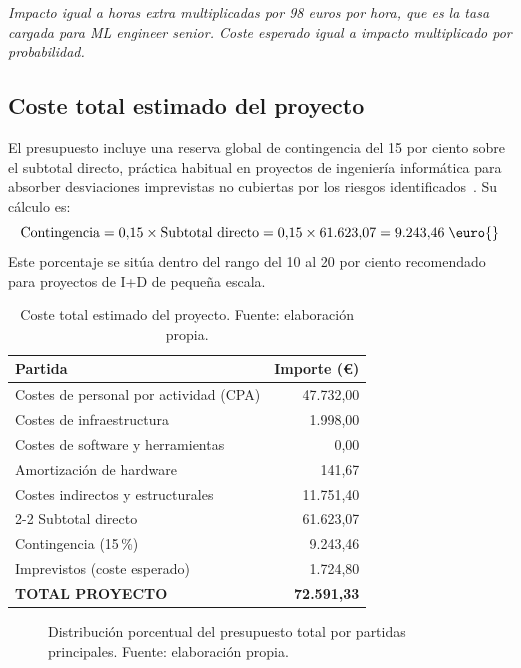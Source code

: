 \noindent\textit{\scriptsize Impacto igual a horas extra multiplicadas por 98 euros por hora, que es la tasa cargada para ML engineer senior. Coste esperado igual a impacto multiplicado por probabilidad.}

\subsection{Coste total estimado del proyecto}

El presupuesto incluye una reserva global de contingencia del 15 por ciento sobre el subtotal directo, práctica habitual en proyectos de ingeniería informática para absorber desviaciones imprevistas no cubiertas por los riesgos identificados~\cite{pmbok}. Su cálculo es:
\[
\text{Contingencia} = 0{,}15 \times \text{Subtotal directo} = 0{,}15 \times 61.623{,}07 = 9.243{,}46\;\text{\euro{}}
\]
Este porcentaje se sitúa dentro del rango del 10 al 20 por ciento recomendado para proyectos de I+D de pequeña escala.

\begin{table}[H]
\centering
\caption{Coste total estimado del proyecto. Fuente: elaboración propia.}
\label{tab:total}
\footnotesize
\begin{tabular}{l r}
\toprule
\textbf{Partida} & \textbf{Importe (\euro{})} \\
\midrule
Costes de personal por actividad (CPA)  & 47.732,00 \\
Costes de infraestructura               & 1.998,00  \\
Costes de software y herramientas       & 0,00      \\
Amortización de hardware                & 141,67    \\
Costes indirectos y estructurales       & 11.751,40 \\
\cmidrule{2-2}
Subtotal directo                        & 61.623,07 \\
Contingencia (15\,\%)                   & 9.243,46  \\
Imprevistos (coste esperado)            & 1.724,80  \\
\midrule
\textbf{TOTAL PROYECTO}                 & \textbf{72.591,33} \\
\bottomrule
\end{tabular}
\end{table}

\begin{figure}[H]
\centering
{}
\caption{Distribución porcentual del presupuesto total por partidas principales. Fuente: elaboración propia.}
\label{fig:distribucion-presupuesto}
\end{figure}


